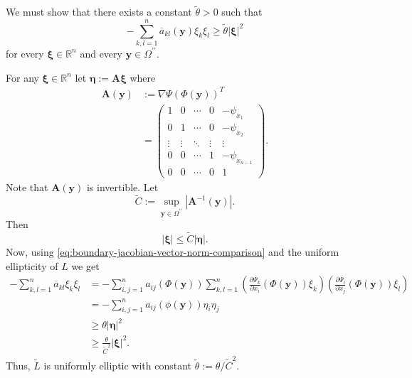 \begin{Proof}
We must show that there exists a constant $\widetilde\theta>0$ such that
\begin{equation}\label{eq:boundary-transformed-principal-ellipticity-bound}
-\sum_{k,l=1}^n\overline a_{kl}(\bm{y})\xi_k\xi_l\geq\widetilde\theta|\bm{\xi}|^2
\end{equation}
for every $\bm{\xi}\in\mathbb{R}^n$ and every $\bm{y}\in\Omega^{\prime\prime}$.

For any $\bm{\xi}\in\mathbb{R}^n$ let $\bm{\eta}:=\bm{A}\bm{\xi}$ where\[\begin{aligned}
\bm{A}(\bm{y})&:=\nabla\Psi(\Phi(\bm{y}))^T\\
&=\begin{pmatrix}
1&0&\cdots&0&-\psi_{x_1}\\
0&1&\cdots&0&-\psi_{x_2}\\
\vdots&\vdots&\ddots&\vdots&\vdots\\
0&0&\cdots&1&-\psi_{x_{n-1}}\\
0&0&\cdots&0&1
\end{pmatrix}.
\end{aligned}\]Note that $\bm{A}(\bm{y})$ is invertible. Let
\begin{equation}\label{eq:boundary-inverse-jacobian-uniform-bound}
\widetilde C:=\sup_{\bm{y}\in\Omega^{\prime\prime}}|\bm{A}^{-1}(\bm{y})|.
\end{equation}
Then
\begin{equation}\label{eq:boundary-jacobian-vector-norm-comparison}
|\bm{\xi}|\leq\widetilde C|\bm{\eta}|.
\end{equation}
Now, using \eqref{eq:boundary-jacobian-vector-norm-comparison} and the uniform ellipticity of $L$ we get\[\begin{aligned}
-\sum_{k,l=1}^n\overline a_{kl}\xi_k\xi_l
&=-\sum_{i,j=1}^na_{ij}(\Phi(\bm{y}))\sum_{k,l=1}^n\left(\frac{\partial\Psi_k}{\partial x_i}(\Phi(\bm{y}))\xi_k\right)\left(\frac{\partial\Psi_l}{\partial x_j}(\Phi(\bm{y}))\xi_l\right)\\
&=-\sum_{i,j=1}^na_{ij}(\phi(\bm{y}))\eta_i\eta_j\\
&\geq\theta|\bm{\eta}|^2\\
&\geq\frac{\theta}{\widetilde C^2}|\bm{\xi}|^2.
\end{aligned}\]Thus, $\widetilde L$ is uniformly elliptic with constant $\widetilde\theta:=\theta/\widetilde C^2$.
\end{Proof}
\endgroup
